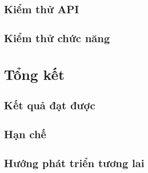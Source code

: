 \documentclass[a4paper,12pt,fleqn,print,oneside]{extarticle}
\begin{document}
\subsection{Kiểm thử API}


\subsection{Kiểm thử chức năng}



\newpage
\section{Tổng kết}
\subsection{Kết quả đạt được}


\subsection{Hạn chế}


\subsection{Hướng phát triển tương lai}


	
\newpage
{}
\end{document}
